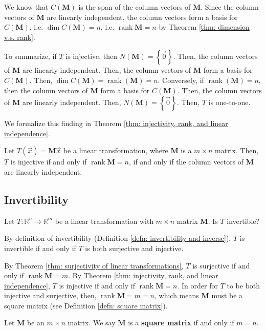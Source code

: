 \documentclass[]{book}
\DeclareMathOperator{\spacedim}{dim}
\DeclareMathOperator{\rank}{rank}
\newcommand{\mat}[1]{\ensuremath{\mathbf{#1}}}
\newcommand{\R}{\ensuremath{\mathbb{R}}}
\begin{document}
We know that $C(\mat{M})$ is the span of the column vectors of $\mat{M}$. Since the column vectors of $\mat{M}$ are linearly independent, the column vectors form a basis for $C(\mat{M})$, i.e. $\spacedim C(\mat{M}) = n$, i.e. $\rank\mat{M} = n$ by Theorem \ref{thm: dimension v.s. rank}.

To summarize, if $T$ is injective, then $N(\mat{M}) = \left\{\vec{0}\right\}$. Then, the column vectors of $\mat{M}$ are linearly independent. Then, the column vectors of $\mat{M}$ form a basis for $C(\mat{M})$. Then, $\spacedim C(\mat{M}) = \rank(\mat{M}) = n$. Conversely, if $\rank(\mat{M})=n$, then the column vectors of $\mat{M}$ form a basis for $C(\mat{M})$. Then, the column vectors of $\mat{M}$ are linearly independent. Then, $N(\mat{M}) = \left\{\vec{0}\right\}$. Then, $T$ is one-to-one. 

We formalize this finding in Theorem \ref{thm: injectivity, rank, and linear independence}.
\begin{theorem}
    \label{thm: injectivity, rank, and linear independence}
    Let $T(\vec{x}) = \mat{M}\vec{x}$ be a linear transformation, where $\mat{M}$ is a $m \times n$ matrix. Then, $T$ is injective if and only if $\rank\mat{M} = n$, if and only if the column vectors of $\mat{M}$ are linearly independent.
\end{theorem}

\subsection{Invertibility}
\label{section: invertibility of linear transformations}
Let $T:\R^n \to \R^m$ be a linear transformation with $m \times n$ matrix $\mat{M}$. Is $T$ invertible? 

By definition of invertibility (Definition \ref{defn: invertibility and inverse}), $T$ is invertible if and only if $T$ is both surjective and injective. 

By Theorem \ref{thm: surjectivity of linear transformations}, $T$ is surjective if and only if $\rank \mat{M} = m$. By Theorem \ref{thm: injectivity, rank, and linear independence}, $T$ is injective if and only if $\rank \mat{M} = n$. In order for $T$ to be both injective and surjective, then, $\rank \mat{M} = m = n$, which means $\mat{M}$ must be a square matrix (see Definition \ref{defn: square matrix}).

\begin{definition}
    \label{defn: square matrix}
    Let $\mat{M}$ be an $m \times n$ matrix. We say $\mat{M}$ is a \textbf{square matrix} if and only if $m = n$.
\end{definition}
\end{document}
